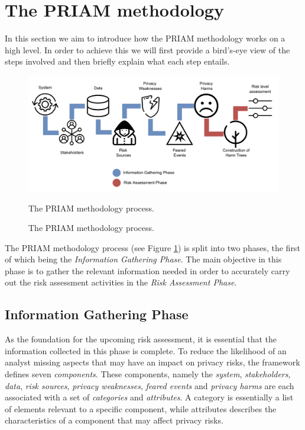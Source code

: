 \section{The PRIAM methodology}
In this section we aim to introduce how the PRIAM methodology works on a high
level. In order to achieve this we will first provide a bird's-eye view of the
steps involved and then briefly explain what each step entails.

\begin{figure}[h!]
  \centering
  \includegraphics[width=\textwidth]{pictures/priam_model.png}
  \caption{The PRIAM methodology process.}{The PRIAM methodology process\footnotemark.}
  \label{fig:priam}
\end{figure}


The PRIAM methodology process (see Figure \ref{fig:priam}) is split into two
phases, the first of which being the \textit{Information Gathering Phase}. The
main objective in this phase is to gather the relevant information needed in
order to accurately carry out the risk assessment activities in the \textit{Risk
Assessment Phase}.

\subsection{Information Gathering Phase}
\label{subsec:IGP}
As the foundation for the upcoming risk assessment, it is essential that the
information collected in this phase is complete. To reduce the likelihood of an
analyst missing aspects that may have an impact on privacy risks, the framework
defines seven \textit{components}. These components, namely the \textit{system},
\textit{stakeholders}, \textit{data}, \textit{risk sources}, \textit{privacy
weaknesses}, \textit{feared events} and \textit{privacy harms} are each
associated with a set of \textit{categories} and \textit{attributes}. A category
is essentially a list of elements relevant to a specific component, while
attributes describes the characteristics of a component that may affect privacy
risks\cite{de:hal-01302541}.

